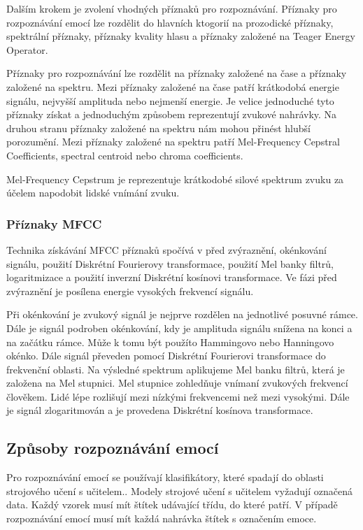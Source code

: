 \documentclass[FM,BP]{tulthesis}
\begin{document}
Dalším krokem je zvolení vhodných příznaků pro rozpoznávání. Příznaky pro rozpoznávání emocí lze rozdělit do hlavních ktogorií na prozodické příznaky, spektrální příznaky, příznaky kvality hlasu a příznaky založené na Teager Energy Operator.

Příznaky pro rozpoznávání lze rozdělit na příznaky založené na čase a příznaky založené na spektru. Mezi příznaky založené na čase patří krátkodobá energie signálu, nejvyšší amplituda nebo nejmenší energie. Je velice jednoduché tyto příznaky získat a jednoduchým způsobem reprezentují zvukové nahrávky. Na druhou stranu příznaky založené na spektru nám mohou přinést hlubší porozumění. Mezi příznaky založené na spektru patří Mel-Frequency Cepstral Coefficients, spectral centroid nebo chroma coefficients.\cite{DBLP:journals/corr/abs-1912-10458}

Mel-Frequency Cepstrum je reprezentuje krátkodobé silové spektrum zvuku za účelem napodobit lidské vnímání zvuku.

\subsubsection{Příznaky MFCC}
Technika získávání MFCC příznaků spočívá v před zvýraznění, okénkování signálu, použití Diskrétní Fourierovy transformace, použití Mel banky filtrů, logaritmizace a použití inverzní Diskrétní kosínovi transformace. Ve fázi před zvýraznění je posílena energie vysokých frekvencí signálu. 

Při okénkování je zvukový signál je nejprve rozdělen na jednotlivé posuvné rámce. Dále je signál podroben okénkování, kdy je amplituda signálu snížena na konci a na začátku rámce. Může k tomu být použíto Hammingovo nebo Hanningovo okénko. Dále signál převeden pomocí Diskrétní Fourierovi transformace do frekvenční oblasti. Na výsledné spektrum aplikujeme Mel banku filtrů, která je založena na Mel stupnici. Mel stupnice zohledňuje vnímaní zvukových frekvencí člověkem. Lidé lépe rozlišují mezi nízkými frekvencemi než mezi vysokými. Dále je signál zlogaritmován a je provedena Diskrétní kosínova transformace. \cite{hui_2019}

\subsection{Způsoby rozpoznávání emocí}
Pro rozpoznávání emocí se používají klasifikátory, které spadají do oblasti strojového učení s učitelem.\cite{DBLP:journals/speech/AkcayO20}. Modely strojové učení s učitelem vyžadují označená data. Každý vzorek musí mít štítek udávající třídu, do které patří. V případě rozpoznávání emocí musí mít každá nahrávka štítek s označením emoce.
\end{document}
